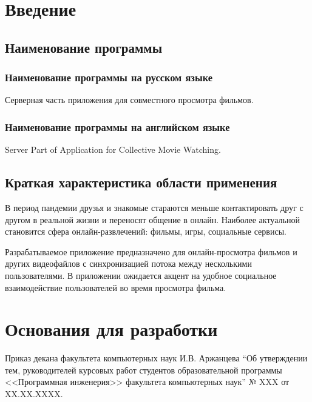 \section{Введение}

\subsection{Наименование программы}

\subsubsection{Наименование программы на русском языке}

Серверная часть приложения для совместного просмотра фильмов.

\subsubsection{Наименование программы на английском языке}

Server Part of Application for Collective Movie Watching.

\subsection{Краткая характеристика области применения}

В период пандемии друзья и знакомые стараются меньше контактировать друг с другом в реальной жизни и переносят общение в онлайн.
Наиболее актуальной становится сфера онлайн-развлечений: фильмы, игры, социальные сервисы.

Разрабатываемое приложение предназначено для онлайн-просмотра фильмов и других видеофайлов с синхронизацией потока
между несколькими пользователями.
В приложении ожидается акцент на удобное социальное взаимодействие пользователей во время просмотра фильма.

\section{Основания для разработки}

Приказ декана факультета компьютерных наук И.В. Аржанцева ``Об утверждении тем, руководителей курсовых работ студентов
образовательной программы <<Программная инженерия>> факультета компьютерных наук'' № XXX от XX.XX.XXXX.
